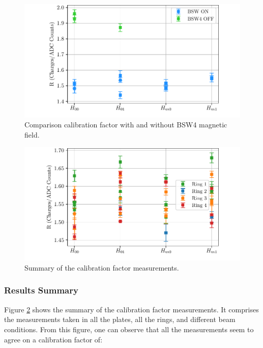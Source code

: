 \begin{figure}[h!]
    \centering
    \includegraphics[width=\columnwidth]{Figure_MagneticFieldCompa/MagnetEffect.pdf}
    \caption{Comparison calibration factor with and without BSW4 magnetic field.}
    \label{fig:MagneticFieldEffect}
\end{figure}

\begin{figure}[h!]
    \centering
    \includegraphics[width=\columnwidth]{Figure_MeasurementSummary/CalSummary.pdf}
    \caption{Summary of the calibration factor measurements.}
    \label{fig:SummaryR}
\end{figure}

\subsubsection{Results Summary}

Figure \ref{fig:SummaryR} shows the summary of the calibration factor measurements. It comprises the measurements taken in all the plates, all the rings, and different beam conditions. From this figure, one can observe that all the measurements seem to agree on a calibration factor of: 

